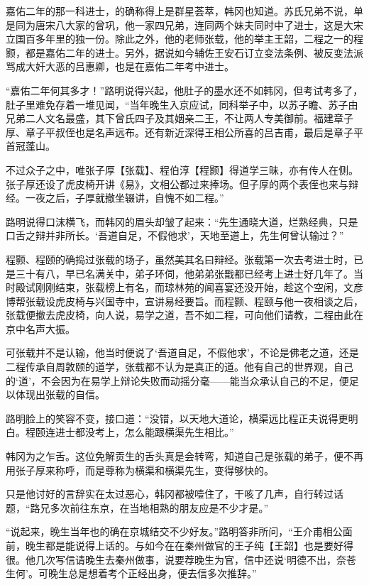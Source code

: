 嘉佑二年的那一科进士，的确称得上是群星荟萃，韩冈也知道。苏氏兄弟不说，单是同为唐宋八大家的曾巩，他一家四兄弟，连同两个妹夫同时中了进士，这是大宋立国百多年里的独一份。除此之外，他的老师张载，他的举主王韶，二程之一的程颢，都是嘉佑二年的进士。另外，据说如今辅佐王安石订立变法条例、被反变法派骂成大奸大恶的吕惠卿，也是在嘉佑二年考中进士。

“嘉佑二年何其多才！”路明说得兴起，他肚子的墨水还不如韩冈，但考试考多了，肚子里难免存着一堆见闻，“当年晚生入京应试，同科举子中，以苏子瞻、苏子由兄弟二人文名最盛，其下曾氏四子及其姻亲二王，不让两人专美御前。福建章子厚、章子平叔侄也是名声远布。还有新近深得王相公所喜的吕吉甫，最后是章子平首冠蓬山。

不过众子之中，唯张子厚【张载】、程伯淳【程颢】得道学三昧，亦有传人在侧。张子厚还设了虎皮椅开讲《易》，文相公都过来捧场。但子厚的两个表侄也来与辩经。一夜之后，子厚就撤坐辍讲，自愧不如二程。”

路明说得口沫横飞，而韩冈的眉头却皱了起来：“先生通晓大道，烂熟经典，只是口舌之辩并非所长。‘吾道自足，不假他求’，天地至道上，先生何曾认输过？”

程颢、程颐的确捣过张载的场子，虽然美其名曰辩经。张载第一次去考进士时，已是三十有八，早已名满关中，弟子环伺，他弟弟张戬都已经考上进士好几年了。当时殿试刚刚结束，张载榜上有名，而琼林苑的闻喜宴还没开始，趁这个空闲，文彦博帮张载设虎皮椅与兴国寺中，宣讲易经要旨。而程颢、程颐与他一夜相谈之后，张载便撤去虎皮椅，向人说，易学之道，吾不如二程，可向他们请教，二程由此在京中名声大振。

可张载并不是认输，他当时便说了‘吾道自足，不假他求’，不论是佛老之道，还是二程传承自周敦颐的道学，张载都不认为是真正的道。他有自己的世界观，自己的‘道’，不会因为在易学上辩论失败而动摇分毫——能当众承认自己的不足，便足以体现出张载的自信。

路明脸上的笑容不变，接口道：“没错，以天地大道论，横渠远比程正夫说得更明白。程颐连进士都没考上，怎么能跟横渠先生相比。”

韩冈为之乍舌。这位免解贡生的舌头真是会转弯，知道自己是张载的弟子，便不再用张子厚来称呼，而是尊称为横渠和横渠先生，变得够快的。

只是他讨好的言辞实在太过恶心，韩冈都被噎住了，干咳了几声，自行转过话题，“路兄多次前往东京，在当地相熟的朋友应是不少才是。”

“说起来，晚生当年也的确在京城结交不少好友。”路明答非所问，“王介甫相公面前，晚生都是能说得上话的。与如今在在秦州做官的王子纯【王韶】也是要好得很。他几次写信请晚生去秦州做事，说要荐晚生为官，信中还说‘明德不出，奈苍生何’。可晚生总是想着考个正经出身，便去信多次推辞。”

